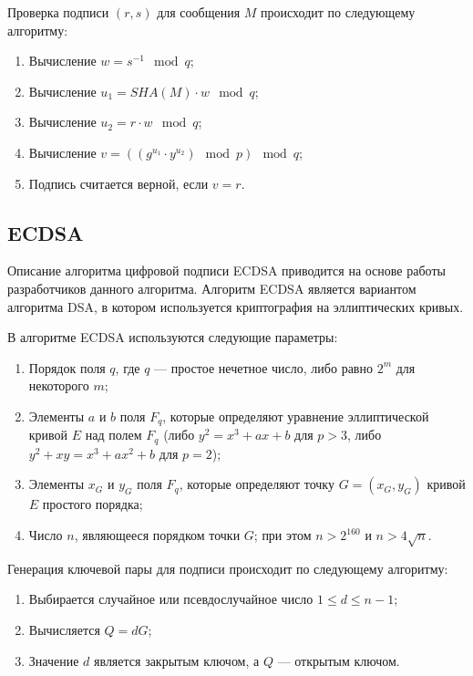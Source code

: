 \documentclass{./civarticle}
\begin{document}
Проверка подписи $(r, s)$ для сообщения $M$ происходит по следующему алгоритму:

\begin{enumerate}
    \item Вычисление $w = s^{-1} \mod q$;
    \item Вычисление $u_1 = SHA(M)\cdot w \mod q$;
    \item Вычисление $u_2 = r\cdot w \mod q$;
    \item Вычисление $v = ((g^{u_1} \cdot y^{u_2}) \mod p) \mod q$;
    \item Подпись считается верной, если $v = r$.
\end{enumerate}

\subsection{ECDSA}

Описание алгоритма цифровой подписи ECDSA приводится на основе работы \cite{ecdsa} разработчиков данного алгоритма. Алгоритм ECDSA является вариантом алгоритма DSA, в котором используется криптография на эллиптических кривых.

В алгоритме ECDSA используются следующие параметры:

\begin{enumerate}
    \item Порядок поля $q$, где $q$ --- простое нечетное число, либо равно $2^m$ для некоторого $m$;
    \item Элементы $a$ и $b$ поля $F_q$, которые определяют уравнение эллиптической кривой $E$ над полем $F_q$ (либо $y^2 = x^3 + ax + b$ для $p > 3$, либо $y^2 + xy = x^3 + ax^2 + b$ для $p = 2$);
    \item Элементы $x_G$ и $y_G$ поля $F_q$, которые определяют точку $G = (x_G, y_G)$ кривой $E$ простого порядка;
    \item Число $n$, являющееся порядком точки $G$; при этом $n > 2^{160}$ и $n > 4\sqrt{n}$.
\end{enumerate}

Генерация ключевой пары для подписи происходит по следующему алгоритму:

\begin{enumerate}
    \item Выбирается случайное или псевдослучайное число $1 \leq d \leq n - 1$;
    \item Вычисляется $Q = dG$;
    \item Значение $d$ является закрытым ключом, а $Q$ --- открытым ключом.
\end{enumerate}
\end{document}
